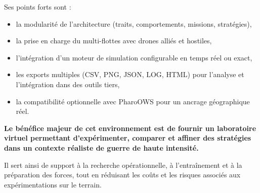 \documentclass[a4paper,11pt]{article}
\begin{document}
Ses points forts sont :
\begin{itemize}
  \item la modularité de l'architecture (traits, comportements, missions, stratégies),
  \item la prise en charge du multi-flottes avec drones alliés et hostiles,
  \item l’intégration d’un moteur de simulation configurable en temps réel ou exact,
  \item les exports multiples (CSV, PNG, JSON, LOG, HTML) pour l’analyse et l’intégration
  dans des outils tiers,
  \item la compatibilité optionnelle avec PharoOWS pour un ancrage géographique réel.
\end{itemize}

\textbf{Le bénéfice majeur de cet environnement est de fournir un laboratoire virtuel
permettant d'expérimenter, comparer et affiner des stratégies dans un contexte réaliste
de guerre de haute intensité.}  

Il sert ainsi de support à la recherche opérationnelle, à l’entraînement et à la préparation
des forces, tout en réduisant les coûts et les risques associés aux expérimentations sur le terrain.
\end{document}
